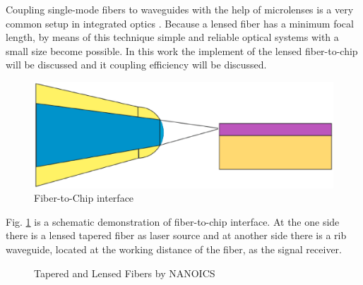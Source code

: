Coupling single-mode fibers to waveguides with the help of microlenses is a very common setup in integrated optics \cite{integrated_optics}. Because a lensed fiber has a minimum focal length, by means of this technique simple and reliable optical systems with a small size become possible. In this work the implement of the lensed fiber-to-chip will be discussed and it coupling efficiency will be discussed.\\
\begin{figure}[!ht]
\centering
\includegraphics[width=.7\textwidth]{bilder/experiment_object}
\caption{Fiber-to-Chip interface}
\label{fig:experiment_object}
\end{figure}

Fig. \ref{fig:experiment_object} is a schematic demonstration of fiber-to-chip interface. At the one side there is a lensed tapered fiber as laser source and at another side there is a rib waveguide\cite{integrated_optics}, located at the working distance of the fiber, as the signal receiver. 

\begin{figure}[!ht]
\centering
{}
\hfill
{}
\label{fig:TLFs}
\caption{ Tapered and Lensed Fibers by NANOICS }
\end{figure}



